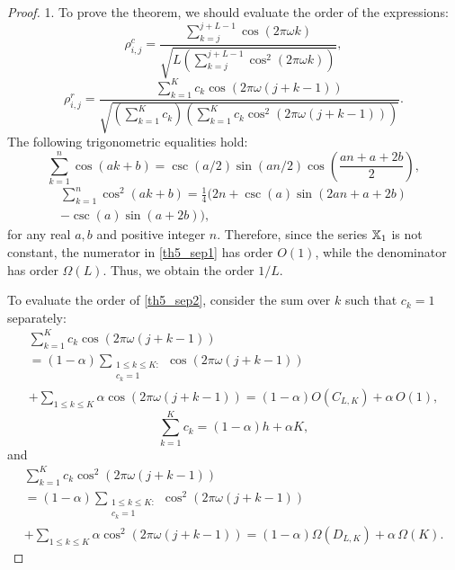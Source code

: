 \documentclass[sii]{ipart}
\begin{document}
\begin{proof}
1. To prove the theorem, we should evaluate the order of the expressions:
	\begin{equation}\label{th5_sep1}
	\rho^c_{i,j} = \frac{\sum_{k=j}^{j + L - 1} \cos(2 \pi \omega k)}{\sqrt{L \left(\sum_{k=j}^{j + L - 1} \cos^2(2 \pi \omega k)\right)}},
	\end{equation}
	\begin{equation}\label{th5_sep2}
	\rho^r_{i,j} = \frac{\sum_{k=1}^K c_k\cos(2 \pi \omega (j + k - 1))}{\sqrt{\left(\sum_{k=1}^K c_k\right) \left(\sum_{k=1}^K c_k\cos^2(2 \pi \omega (j + k - 1))\right)}}.
	\end{equation}
	The following trigonometric equalities hold:
	\begin{equation}
	\label{sumcos}
	\sum_{k=1}^n \cos(ak + b) = \csc(a/2) \sin(an / 2) \cos \left(\frac{an + a + 2b}{2} \right),
	\end{equation}
	\begin{multline}
	\label{sumsqcos}
	\sum_{k=1}^n \cos^2(ak + b) = \frac{1}{4}(2n + \csc(a) \sin(2an + a + 2b) \\ - \csc(a)\sin(a + 2b)),
	\end{multline}
	for any real $a, b$ and positive integer $n$.
	Therefore, since the series $\mathbb{X}_1$ is not constant, the numerator in \eqref{th5_sep1} has order $O(1)$, while the denominator has order $\Omega(L)$. Thus, we obtain the order $1/L$.
	
	To evaluate the order of \eqref{th5_sep2}, consider the sum over $k$ such that $c_k=1$ separately:
	\begin{multline*}
	\sum_{k=1}^K c_k\cos(2 \pi \omega (j + k - 1))  \\ = (1-\alpha) \sum_{\substack{1 \le k \le K: \\ c_k = 1}}\cos(2 \pi \omega (j + k - 1)) \\ +\sum_{1 \le k \le K}\alpha \cos(2 \pi \omega (j + k - 1)) = (1-\alpha)O(C_{L,K}) + \alpha\, O(1),
	\end{multline*}
    \begin{equation*}
	\sum_{k=1}^K c_k = (1-\alpha) h + \alpha K,
	\end{equation*}
and
    \begin{multline*}
	\sum_{k=1}^K c_k\cos^2(2 \pi \omega (j + k - 1)) \\ = (1-\alpha)\sum_{\substack{1 \le k \le K: \\ c_k = 1}}\cos^2(2 \pi \omega (j + k - 1)) \\ +\sum_{1 \le k \le K }\alpha \cos^2(2 \pi \omega (j + k - 1)) = (1-\alpha) \Omega(D_{L,K}) + \alpha\, \Omega(K).
    \end{multline*}


\end{proof}
\end{document}
